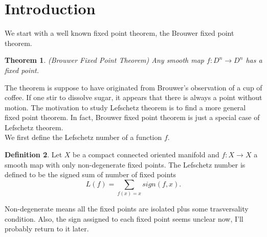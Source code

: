 \documentclass[psamsfonts]{amsart}
\newtheorem{theorem}{Theorem}[section]
\theoremstyle{definition}
\newtheorem{defn}[theorem]{Definition}
\theoremstyle{remark}
\numberwithin{equation}{section}
\begin{document}
	\section{Introduction}
		We start with a well known fixed point theorem, the Brouwer fixed point theorem.
		\begin{theorem} (Brouwer Fixed Point Theorem)
			Any smooth map $f: D^n \to D^n$ has a fixed point.
		\end{theorem}
		
		The theorem is suppose to have originated from Brouwer's observation of a cup of coffee. If one stir to dissolve sugar, it appears that there is always a point without motion. The motivation to study Lefschetz theorem is to find a more general fixed point theorem. In fact, Brouwer fixed point theorem is just a special case of Lefschetz theorem.\\ 
		\indent We first define the Lefschetz number of a function $f$.
		\begin{defn}
			Let $X$ be a compact connected oriented manifold and $f: X \to X$  a smooth map with only non-degenerate fixed points. The Lefschetz number is defined to be the signed sum of number of fixed points
			\begin{equation}
				L(f) = \sum_{f(x) = x} sign(f,x).
			\end{equation}
		\end{defn}
		Non-degenerate means all the fixed points are isolated plus some trasversality condition. Also, the sign assigned to each fixed point seems unclear now, I'll probably return to it later.
		
\end{document}
